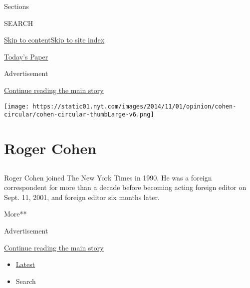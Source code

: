 Sections

SEARCH

\protect\hyperlink{site-content}{Skip to
content}\protect\hyperlink{site-index}{Skip to site index}

\href{https://myaccount.nytimes.com/auth/login?response_type=cookie\&client_id=vi}{}

\href{https://www.nytimes.com/section/todayspaper}{Today's Paper}

Advertisement

\protect\hyperlink{after-top}{Continue reading the main story}

\texttt{[image: https://static01.nyt.com/images/2014/11/01/opinion/cohen-circular/cohen-circular-thumbLarge-v6.png]}

\hypertarget{roger-cohen}{%
\section{Roger Cohen}\label{roger-cohen}}

\hypertarget{section}{%
\subsection{}\label{section}}

Roger Cohen joined The New York Times in 1990. He was a foreign
correspondent for more than a decade before becoming acting foreign
editor on Sept. 11, 2001, and foreign editor six months later.

More**

Advertisement

\protect\hyperlink{after-mid1}{Continue reading the main story}

\begin{itemize}
\tightlist
\item
  \protect\hyperlink{stream-panel}{Latest}
\item
  Search
\end{itemize}

